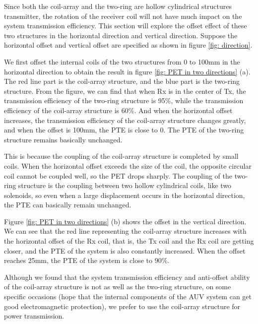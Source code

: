 Since both the coil-array and the two-ring are hollow cylindrical structures transmitter, the rotation of the receiver coil will not have much impact on the system transmission efficiency. This section will explore the offset effect of these two structures in the horizontal direction and vertical direction.
Suppose the horizontal offset and vertical offset are specified as shown in figure \ref{fig: direction}.

We first offset the internal coils of the two structures from 0 to 100mm in the horizontal direction to obtain the result in figure \ref{fig: PET in two directions} (a). The red line part is the coil-array structure, and the blue part is the two-ring structure. From the figure, we can find that when Rx is in the center of Tx, the transmission efficiency of the two-ring structure is 95\%, while the transmission efficiency of the coil-array structure is 60\%. And when the horizontal offset increases, the transmission efficiency of the coil-array structure changes greatly, and when the offset is 100mm, the PTE is close to 0. The PTE of the two-ring structure remains basically unchanged.

This is because the coupling of the coil-array structure is completed by small coils. When the horizontal offset exceeds the size of the coil, the opposite circular coil cannot be coupled well, so the PET drops sharply. The coupling of the two-ring structure is the coupling between two hollow cylindrical coils, like two solenoids, so even when a large displacement occurs in the horizontal direction, the PTE can basically remain unchanged.

Figure \ref{fig: PET in two directions} (b) shows the offset in the vertical direction. We can see that the red line representing the coil-array structure increases with the horizontal offset of the Rx coil, that is, the Tx coil and the Rx coil are getting closer, and the PTE of the system is also constantly increased. When the offset reaches 25mm, the PTE of the system is close to 90\%.

Although we found that the system transmission efficiency and anti-offset ability of the coil-array structure is not as well as the two-ring structure, on some specific occasions (hope that the internal components of the AUV system can get good electromagnetic protection), we prefer to use the coil-array structure for power transmission.

